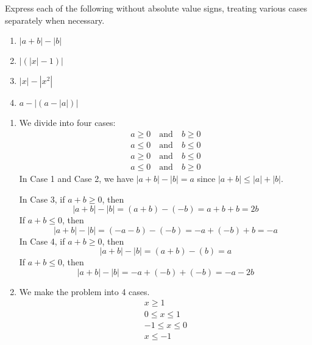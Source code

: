 \begin{pr}
  Express each of the following without absolute value
  signs, treating various cases separately when necessary.
  \begin{enumerate}[label=(\roman*)]
    \item $|a+b|-|b|$
    \item $|(|x|-1)|$
    \item $|x|-|x^2|$
    \item $a-|(a-|a|)|$
  \end{enumerate}
\end{pr}
\pagebreak
\begin{solution}
  \begin{enumerate}[label=(\roman*)]
    \item We divide into four cases:
    \begin{align}
      a\geq0 \quad \text{and} \quad b\geq0 \tag{Case 1} \\
      a\leq0 \quad \text{and} \quad b\leq0 \tag{Case 2} \\
      a\geq0 \quad \text{and} \quad b\leq0 \tag{Case 3} \\
      a\leq0 \quad \text{and} \quad b\geq0 \tag{Case 4}
    \end{align}
    In Case 1 and Case 2, we have $|a+b|-|b|=a$
    since $|a+b|\leq|a|+|b|$.\par
    In Case 3,
    if $a+b\geq0$, then
    \begin{equation*}
      |a+b|-|b|=(a+b)-(-b)=a+b+b=2b
    \end{equation*}
    If $a+b\leq0$, then
    \begin{equation*}
      |a+b|-|b|=(-a-b)-(-b)=-a+(-b)+b=-a
    \end{equation*}
    In Case 4, if $a+b\geq0$, then
    \begin{equation*}
      |a+b|-|b|=(a+b)-(b)=a
    \end{equation*}
    If $a+b\leq0$, then
    \begin{equation*}
      |a+b|-|b|=-a+(-b)+(-b)=-a-2b
    \end{equation*}
    \item We make the problem into 4 cases.
    \begin{align}
      x\geq1 \tag{Case 1} \\
      0\leq x\leq 1 \tag{Case 2} \\
      -1\leq x\leq 0 \tag{Case 3} \\
      x\leq -1 \tag{Case 4}
    \end{align}

\end{enumerate}
\end{solution}
